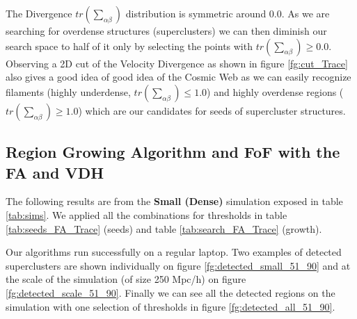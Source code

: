 \documentclass[12pt]{article}
\begin{document}
\begin{par}
The Divergence $tr \left(\sum_{\alpha\beta}\right)$ distribution is symmetric
 around 0.0. As we are searching for overdense
  structures (superclusters) we can then diminish
   our search space to half of it only by
    selecting the points with $tr \left(\sum_{\alpha\beta}\right) \geq 0.0$. \\
Observing a 2D cut of the Velocity Divergence as shown in
 figure \ref{fg:cut_Trace} also gives a good idea
  of good idea of the Cosmic Web as we can easily
   recognize filaments (highly underdense, $tr \left(\sum_{\alpha\beta}\right)
    \leq 1.0$) and highly overdense regions
     ($tr \left(\sum_{\alpha\beta}\right) \geq 1.0$) which are our candidates
      for seeds of supercluster structures.
\end{par}


\subsection{Region Growing Algorithm and FoF with the FA and VDH}
\begin{par}
The following results are from the \textbf{Small
 (Dense)} simulation exposed in table
  \ref{tab:sims}. We applied all the combinations
   for thresholds in table \ref{tab:seeds_FA_Trace}
    (seeds)  and table \ref{tab:search_FA_Trace}
     (growth). \\
\end{par}

\begin{par}
Our algorithms run successfully on a regular
 laptop. Two examples of detected superclusters are
  shown individually on figure
   \ref{fg:detected_small_51_90} and at the scale
    of the simulation (of size 250 Mpc/h) on figure
     \ref{fg:detected_scale_51_90}. Finally we can
      see all the detected regions on the
       simulation with one selection of thresholds
        in figure \ref{fg:detected_all_51_90}.
\end{par}
\end{document}
